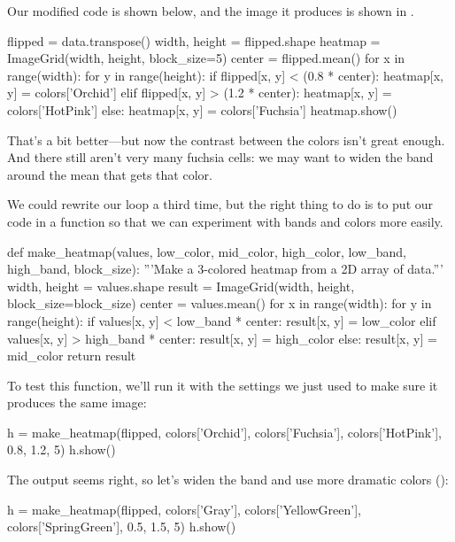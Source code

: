Our modified code is shown below,
and the image it produces is shown in .

\begin{VerbIn}
flipped = data.transpose()
width, height = flipped.shape
heatmap = ImageGrid(width, height, block_size=5)
center = flipped.mean()
for x in range(width):
    for y in range(height):
        if flipped[x, y] < (0.8 * center):
            heatmap[x, y] = colors['Orchid']
        elif flipped[x, y] > (1.2 * center):
            heatmap[x, y] = colors['HotPink']
        else:
            heatmap[x, y] = colors['Fuchsia']
heatmap.show()
\end{VerbIn}


That's a bit better---but now the contrast between the colors isn't
great enough. And there still aren't very many fuchsia cells: we may
want to widen the band around the mean that gets that color.

We could rewrite our loop a third time, but the right thing to do is to
put our code in a function so that we can experiment with bands and
colors more easily.

\begin{VerbIn}
def make_heatmap(values, low_color, mid_color, high_color, low_band, high_band, block_size):
    '''Make a 3-colored heatmap from a 2D array of data.'''
    width, height = values.shape
    result = ImageGrid(width, height, block_size=block_size)
    center = values.mean()
    for x in range(width):
        for y in range(height):
            if values[x, y] < low_band * center:
                result[x, y] = low_color
            elif values[x, y] > high_band * center:
                result[x, y] = high_color
            else:
                result[x, y] = mid_color
    return result
\end{VerbIn}

To test this function, we'll run it with the settings we just used to make sure it produces the same image:

\begin{VerbIn}
h = make_heatmap(flipped, colors['Orchid'], colors['Fuchsia'], colors['HotPink'], 0.8, 1.2, 5)
h.show()
\end{VerbIn}

The output seems right, so let's widen the band and use more dramatic colors ():

\begin{VerbIn}
h = make_heatmap(flipped, colors['Gray'], colors['YellowGreen'], colors['SpringGreen'], 0.5, 1.5, 5)
h.show()
\end{VerbIn}

